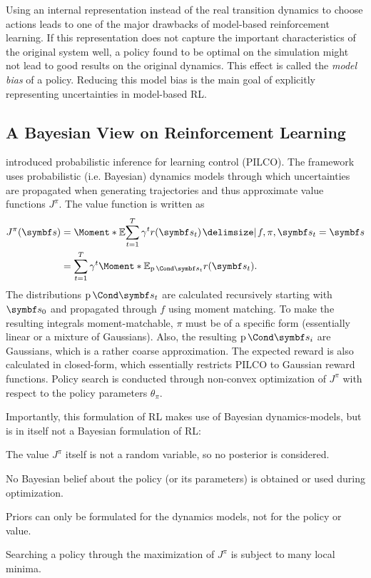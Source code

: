 Using an internal representation instead of the real transition dynamics to choose actions leads to one of the major drawbacks of model-based reinforcement learning.
If this representation does not capture the important characteristics of the original system well, a policy found to be optimal on the simulation might not lead to good results on the original dynamics.
This effect is called the \emph{model bias} of a policy.
Reducing this model bias is the main goal of explicitly representing uncertainties in model-based RL.


\subsection{A Bayesian View on Reinforcement Learning}
\textcite{deisenroth_pilco_2011} introduced probabilistic inference for learning control (PILCO).
The framework uses probabilistic (i.e. Bayesian) dynamics models through which uncertainties are propagated when generating trajectories and thus approximate value functions $J^\pi$.
The value function is written as
\begin{align}
\begin{split}
    J^\pi(\mat{s})
    &= \Moment*{\E}{\sum_{t=1}^T \gamma^t r(\mat{s}_t) \given f, \pi, \mat{s}_t = \mat{s}} \\
    &= \sum_{t=1}^T \gamma^t \Moment*{\E_{\Prob{\mat{s}_t}}}{r(\mat{s}_t)}.
\end{split}
\end{align}
The distributions $\Prob{\mat{s}_t}$ are calculated recursively starting with $\mat{s}_0$ and propagated through $f$ using moment matching.
To make the resulting integrals moment-matchable, $\pi$ must be of a specific form (essentially linear or a mixture of Gaussians).
Also, the resulting $\Prob{\mat{s}_i}$ are Gaussians, which is a rather coarse approximation.
The expected reward is also calculated in closed-form, which essentially restricts PILCO to Gaussian reward functions.
Policy search is conducted through non-convex optimization of $J^\pi$ with respect to the policy parameters $\theta_\pi$.

Importantly, this formulation of RL makes use of Bayesian dynamics-models, but is in itself not a Bayesian formulation of RL:
\begin{inparaenum}[(1)]
    \item The value $J^\pi$ itself is not a random variable, so no posterior is considered.
    \item No Bayesian belief about the policy (or its parameters) is obtained or used during optimization.
    \item Priors can only be formulated for the dynamics models, not for the policy or value.
    \item Searching a policy through the maximization of $J^\pi$ is subject to many local minima.
\end{inparaenum}

